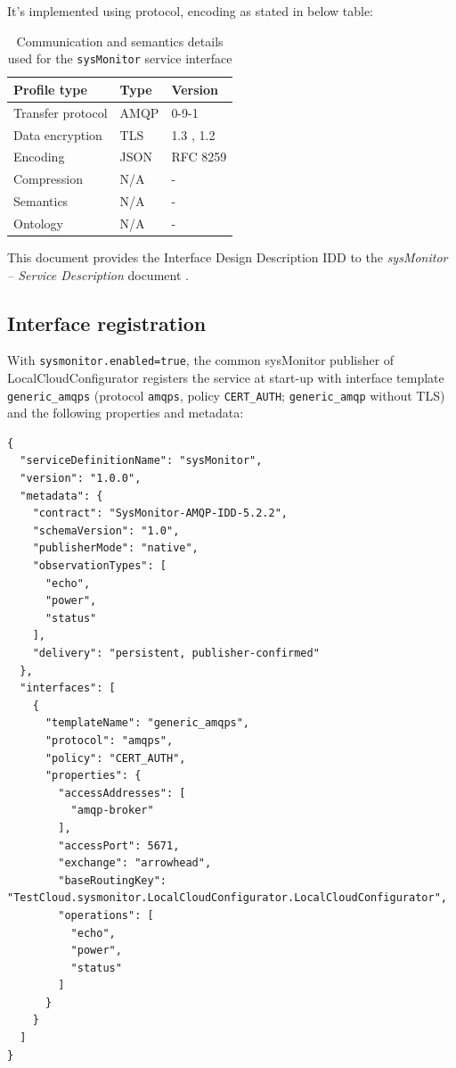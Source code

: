 \documentclass[a4paper]{arrowhead}
\begin{document}
It's implemented using protocol, encoding as stated in below table:
\begin{table}[ht!]
  \centering
  \begin{tabular}{|l|l|l|}
    \hline
    \rowcolor{gray!33} Profile type & Type & Version \\ \hline
    Transfer protocol & AMQP & 0-9-1 \cite{amqp091} \\ \hline
    Data encryption & TLS & 1.3 \cite{rfc8446}, 1.2 \cite{rfc5246} \\ \hline
    Encoding & JSON & RFC 8259 \cite{rfc8259} \\ \hline
    Compression & N/A & - \\ \hline
    Semantics & N/A & - \\ \hline
    Ontology & N/A & - \\ \hline
  \end{tabular}
  \caption{Communication and semantics details used for the \texttt{sysMonitor} service interface}
  \label{tab:comunication_semantics_profile}
\end{table}

This document provides the Interface Design Description IDD to the \textit{sysMonitor -- Service Description} document \cite{lcc-sysMonitor-sd}.

\subsection{Interface registration}

With \texttt{sysmonitor.enabled=true}, the common sysMonitor publisher of LocalCloudConfigurator registers the service at start-up with interface template \texttt{generic\_\allowbreak{}amqps} (protocol \texttt{amqps}, policy \texttt{CERT\_\allowbreak{}AUTH}; \texttt{generic\_\allowbreak{}amqp} without TLS) and the following properties and metadata:

\begin{lstlisting}[caption={Registered service instance (TestCloud).}]
{
  "serviceDefinitionName": "sysMonitor",
  "version": "1.0.0",
  "metadata": {
    "contract": "SysMonitor-AMQP-IDD-5.2.2",
    "schemaVersion": "1.0",
    "publisherMode": "native",
    "observationTypes": [
      "echo",
      "power",
      "status"
    ],
    "delivery": "persistent, publisher-confirmed"
  },
  "interfaces": [
    {
      "templateName": "generic_amqps",
      "protocol": "amqps",
      "policy": "CERT_AUTH",
      "properties": {
        "accessAddresses": [
          "amqp-broker"
        ],
        "accessPort": 5671,
        "exchange": "arrowhead",
        "baseRoutingKey": "TestCloud.sysmonitor.LocalCloudConfigurator.LocalCloudConfigurator",
        "operations": [
          "echo",
          "power",
          "status"
        ]
      }
    }
  ]
}
\end{lstlisting}
\end{document}
